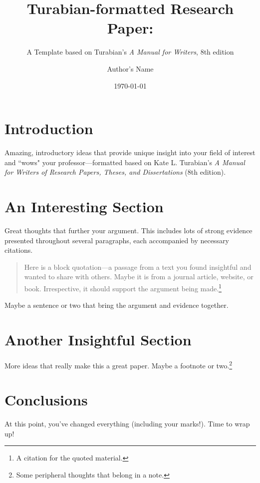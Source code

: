 \documentclass{turabian-researchpaper}
\title{Turabian-formatted Research Paper:}
\subtitle{A Template based on Turabian's \emph{A Manual for Writers}, 8th edition}
\author{Author's Name}
\date{\today}
\begin{document}
\maketitle


\section{Introduction}

Amazing, introductory ideas that provide unique insight into your field of interest and ``wows" your professor---formatted based on Kate L. Turabian's \emph{A Manual for Writers of Research Papers, Theses, and Dissertations} (8th edition).


\section{An Interesting Section}

Great thoughts that further your argument. This includes lots of strong evidence presented throughout several paragraphs, each accompanied by necessary citations.
\begin{quotation}
    \noindent Here is a block quotation---a passage from a text you found insightful and wanted to share with others. Maybe it is from a journal article, website, or book. Irrespective, it should support the argument being made.\footnote{A citation for the quoted material.}
\end{quotation}
Maybe a sentence or two that bring the argument and evidence together.\autocite[34]{example_source}


\section{Another Insightful Section}

More ideas that really make this a great paper. Maybe a footnote or two.\footnote{Some peripheral thoughts that belong in a note.}


\section{Conclusions}

At this point, you've changed everything (including your marks!). Time to wrap up!


\clearpage
\printbibliography
\end{document}
